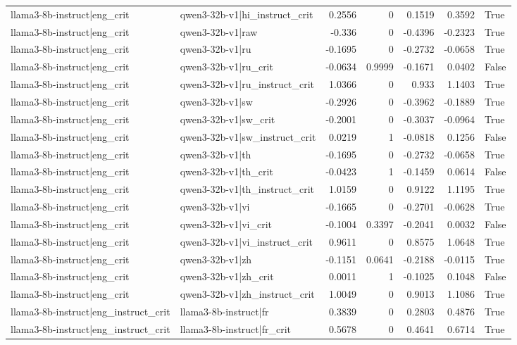 \begin{table}
\begin{tabular}{l l r r r r l}
llama3-8b-instruct|eng_crit & qwen3-32b-v1|hi_instruct_crit & 0.2556 & 0 & 0.1519 & 0.3592 & True \\
llama3-8b-instruct|eng_crit & qwen3-32b-v1|raw & -0.336 & 0 & -0.4396 & -0.2323 & True \\
llama3-8b-instruct|eng_crit & qwen3-32b-v1|ru & -0.1695 & 0 & -0.2732 & -0.0658 & True \\
llama3-8b-instruct|eng_crit & qwen3-32b-v1|ru_crit & -0.0634 & 0.9999 & -0.1671 & 0.0402 & False \\
llama3-8b-instruct|eng_crit & qwen3-32b-v1|ru_instruct_crit & 1.0366 & 0 & 0.933 & 1.1403 & True \\
llama3-8b-instruct|eng_crit & qwen3-32b-v1|sw & -0.2926 & 0 & -0.3962 & -0.1889 & True \\
llama3-8b-instruct|eng_crit & qwen3-32b-v1|sw_crit & -0.2001 & 0 & -0.3037 & -0.0964 & True \\
llama3-8b-instruct|eng_crit & qwen3-32b-v1|sw_instruct_crit & 0.0219 & 1 & -0.0818 & 0.1256 & False \\
llama3-8b-instruct|eng_crit & qwen3-32b-v1|th & -0.1695 & 0 & -0.2732 & -0.0658 & True \\
llama3-8b-instruct|eng_crit & qwen3-32b-v1|th_crit & -0.0423 & 1 & -0.1459 & 0.0614 & False \\
llama3-8b-instruct|eng_crit & qwen3-32b-v1|th_instruct_crit & 1.0159 & 0 & 0.9122 & 1.1195 & True \\
llama3-8b-instruct|eng_crit & qwen3-32b-v1|vi & -0.1665 & 0 & -0.2701 & -0.0628 & True \\
llama3-8b-instruct|eng_crit & qwen3-32b-v1|vi_crit & -0.1004 & 0.3397 & -0.2041 & 0.0032 & False \\
llama3-8b-instruct|eng_crit & qwen3-32b-v1|vi_instruct_crit & 0.9611 & 0 & 0.8575 & 1.0648 & True \\
llama3-8b-instruct|eng_crit & qwen3-32b-v1|zh & -0.1151 & 0.0641 & -0.2188 & -0.0115 & True \\
llama3-8b-instruct|eng_crit & qwen3-32b-v1|zh_crit & 0.0011 & 1 & -0.1025 & 0.1048 & False \\
llama3-8b-instruct|eng_crit & qwen3-32b-v1|zh_instruct_crit & 1.0049 & 0 & 0.9013 & 1.1086 & True \\
llama3-8b-instruct|eng_instruct_crit & llama3-8b-instruct|fr & 0.3839 & 0 & 0.2803 & 0.4876 & True \\
llama3-8b-instruct|eng_instruct_crit & llama3-8b-instruct|fr_crit & 0.5678 & 0 & 0.4641 & 0.6714 & True \\

\end{tabular}
\end{table}
